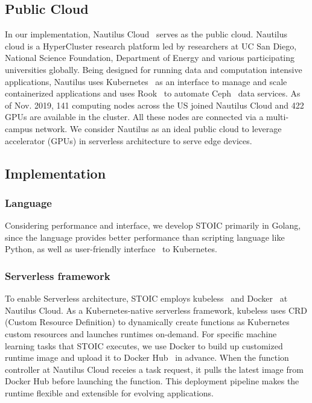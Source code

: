  \subsection{Public Cloud}
 
 In our implementation, Nautilus Cloud~\cite{ref:nautilus} serves as the public cloud. Nautilus cloud is a HyperCluster research platform led by researchers at UC San Diego, National Science Foundation, Department of Energy and various participating universities globally. Being designed for running data and computation intensive applications, Nautilus uses Kubernetes~\cite{ref:k8s} as an interface to manage and scale containerized applications and uses Rook~\cite{ref:rook} to automate Ceph~\cite{ref:ceph} data services. As of Nov. 2019, 141 computing nodes across the US joined Nautilus Cloud and 422 GPUs are available in the cluster. All these nodes are connected via a multi-campus network. We consider Nautilus as an ideal public cloud to leverage accelerator (GPUs) in serverless architecture to serve edge devices. 
 
 \subsection{Implementation}
 
 \subsubsection{Language}
 Considering performance and interface, we develop STOIC primarily in Golang, since the language provides better performance than scripting language like Python, as well as user-friendly interface~\cite{ref:client-go} to Kubernetes. 
 
 \BlankLine
 \subsubsection{Serverless framework}
 To enable Serverless architecture, STOIC employs kubeless~\cite{ref:kubeless} and Docker~\cite{ref:docker} at Nautilus Cloud. As a Kubernetes-native serverless framework, kubeless uses CRD (Custom Resource Definition)\cite{ref:crd} to dynamically create functions as Kubernetes custom resources and launches runtimes on-demand. For specific machine learning tasks that STOIC executes, we use Docker to build up customized runtime image and upload it to Docker Hub~\cite{ref:dockerhub} in advance. When the function controller at Nautilus Cloud receies a task request, it pulls the latest image from Docker Hub before launching the function. This deployment pipeline makes the runtime flexible and extensible for evolving applications. 
 
